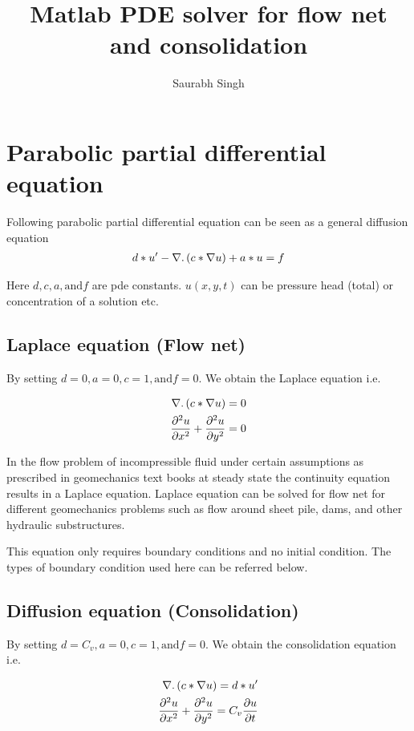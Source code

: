 \documentclass[12pt,longbibliography]{article}
\title{\vspace{-8ex}Matlab PDE solver for flow net and consolidation}
\author{\vspace{-5ex}Saurabh Singh}
\date{\vspace{-8ex}}
\begin{document}
\maketitle
\section{Parabolic partial differential equation}
Following parabolic partial differential equation can be seen as a general diffusion equation
\begin{align*}
d*u^{\prime } -\nabla \ldotp \left(c*\nabla u\right)+a*u=f
\end{align*}

Here $d,c,a, \text{and} f$ are pde constants. $u(x,y,t)$ can be pressure head (total) or concentration of a solution etc. 

\subsection{Laplace equation (Flow net)}
By setting  $d = 0, a = 0, c = 1, \text{and} f = 0$. We obtain the Laplace equation i.e.

\begin{align*}
\nabla \ldotp \left(c*\nabla u\right)=0\\
\frac{\partial^2 u}{\partial x^2 }+\frac{\partial^2 u}{\partial y^2 }=0
\end{align*}

In the flow problem of incompressible fluid under certain assumptions as prescribed in geomechanics text books at steady state the continuity equation results in a Laplace equation. Laplace equation can be solved for flow net for different geomechanics problems such as flow around sheet pile, dams, and other hydraulic substructures.

This equation only requires boundary conditions and no initial condition. The types of boundary condition used here can be referred below.

\subsection{Diffusion equation (Consolidation)}
By setting  $d = C_v, a = 0, c = 1, \text{and} f = 0$. We obtain the consolidation equation i.e.

\begin{align*}
\nabla \ldotp \left(c*\nabla u\right)=d*u^{\prime }\\
\frac{\partial^2 u}{\partial x^2 }+\frac{\partial^2 u}{\partial y^2 }=C_v \frac{\partial u}{\partial t}
\end{align*}
\end{document}
